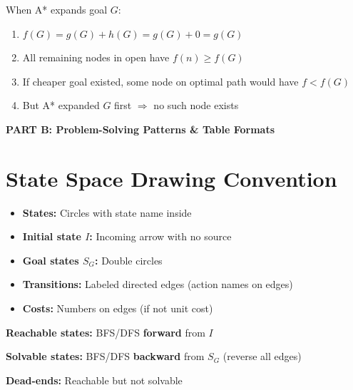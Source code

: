 \documentclass[11pt,a4paper]{article}
\begin{document}
\begin{warningbox}
When A* expands goal $G$:
\begin{enumerate}[leftmargin=*,nosep]
\item $f(G) = g(G) + h(G) = g(G) + 0 = g(G)$
\item All remaining nodes in open have $f(n) \geq f(G)$
\item If cheaper goal existed, some node on optimal path would have $f < f(G)$
\item But A* expanded $G$ first $\Rightarrow$ no such node exists
\end{enumerate}
\end{warningbox}

\newpage

\begin{center}
\textbf{\LARGE PART B: Problem-Solving Patterns \& Table Formats}
\end{center}
\vspace{1em}

\renewcommand{\thesection}{B.\arabic{section}}

\section{State Space Drawing Convention}

\begin{definitionbox}
\begin{itemize}[leftmargin=*,nosep]
\item \textbf{States:} Circles with state name inside
\item \textbf{Initial state $I$:} Incoming arrow with no source
\item \textbf{Goal states $S_G$:} Double circles
\item \textbf{Transitions:} Labeled directed edges (action names on edges)
\item \textbf{Costs:} Numbers on edges (if not unit cost)
\end{itemize}
\end{definitionbox}

\begin{examplebox}
\textbf{Reachable states:} BFS/DFS \textbf{forward} from $I$

\textbf{Solvable states:} BFS/DFS \textbf{backward} from $S_G$ (reverse all edges)

\textbf{Dead-ends:} Reachable but not solvable
\end{examplebox}
\end{document}
